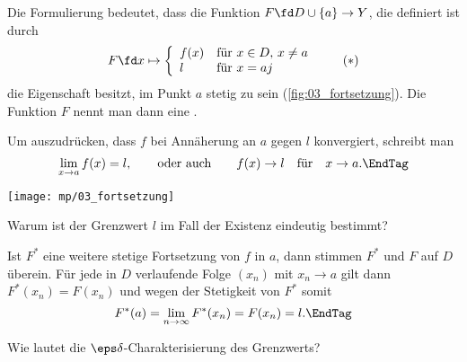 \begin{antwort}
  Die Formulierung bedeutet, dass die Funktion 
  $F \fd D \cup \{ a \} \to Y$, die definiert ist durch 
  \begin{equation}
    F \fd 
    x \mapsto \left\{ \begin{array}{ll} 
        f(x) & \text{für $x\in D$, $x\not=a$} \\
        l  & \text{für $x=a$}
        j\end{array}\right.
    \tag{$\ast$}
  \end{equation}
  die Eigenschaft besitzt, im Punkt $a$ stetig zu sein (\sieheAbbildung\ref{fig:03_fortsetzung}). 
  Die Funktion $F$ nennt man dann eine .

  Um auszudrücken, dass $f$ bei Annäherung an $a$ gegen 
  $l$ konvergiert, schreibt man
  \begin{equation}
    \lim_{x\to a} f(x) = l,\qquad\text{oder auch}\qquad 
    f(x) \to l\quad\text{für}\quad x\to a. \EndTag
  \end{equation}

  \begin{center}
    \texttt{[image: mp/03\_fortsetzung]}
    \label{fig:03_fortsetzung}
  \end{center}
\end{antwort} 

\begin{frage}
  Warum ist der Grenzwert $l$ im Fall der Existenz eindeutig bestimmt?
\end{frage}

\begin{antwort}
  Ist $F^*$ eine weitere 
  stetige Fortsetzung von $f$ in $a$, dann stimmen $F^*$ und $F$ auf 
  $D$ überein. Für jede in $D$ verlaufende Folge $(x_n)$ mit 
  $x_n\to a$ gilt dann $F^*(x_n)=F(x_n)$ und wegen der 
  Stetigkeit von $F^*$ somit 
  \[
  F^*(a)=\lim_{n\to\infty} F^*(x_n)=F(x_n)=l
  . \EndTag\] 
\end{antwort}

\begin{frage}\label{03_epsd}
  Wie lautet die $\eps\delta$-Charakterisierung des Grenzwerts?
\end{frage}

